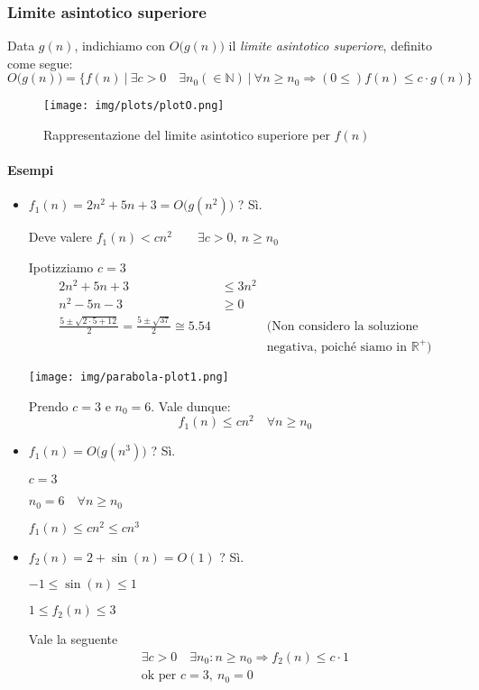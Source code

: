 \subsubsection{Limite asintotico superiore}
Data $g(n)$, indichiamo con $O \big(g(n) \big)$ il \emph{limite asintotico superiore}, definito come segue:
\begin{displaymath}
	O \big(g(n) \big) = \{ f(n) \ \vert \ \exists c > 0 \quad \exists n_0 (\in \mathbb{N}) \ \vert \ \forall n \geq n_0 \Rightarrow (0 \leq) f(n) \leq c \cdot g(n) \}
\end{displaymath}

\begin{figure}[!htb]
	\centering
	\texttt{[image: img/plots/plotO.png]}
	\caption{Rappresentazione del limite asintotico superiore per $f(n)$}
\end{figure}

\paragraph{Esempi}
\begin{itemize}
	\item $f_1(n) = 2n^2 + 5n + 3 = O \big(g(n^2) \big)$ ? Sì. \par
	Deve valere $f_1(n) < cn^2 \qquad \exists c > 0, \ n \geq n_0$ \par
	Ipotizziamo $c = 3$
	\begin{align*}
		2n^2 + 5n + 3 & \leq 3n^2 \\
		n^2 - 5n - 3 & \geq 0 \\
		\frac{5 \pm \sqrt{2 \cdot 5 + 12}}{2} = \frac{5 \pm \sqrt{37}}{2} \cong 5.54 && \text{(Non considero la soluzione} \\ && \text{negativa, poiché siamo in } \mathbb{R}^+ \text{)}
	\end{align*}
	\begin{center}
		\texttt{[image: img/parabola-plot1.png]}
	\end{center}
	
	Prendo $c = 3$ e $n_0 = 6$. Vale dunque:
	\begin{displaymath}
		f_1(n) \leq cn^2 \quad \forall n \geq n_0
	\end{displaymath}

	\item $f_1(n) = O \big(g(n^3) \big)$ ? Sì. \par
	$c = 3 $\par
	$n_0 = 6 \quad \forall n \geq n_0$ \par
	$f_1(n) \leq cn^2 \leq cn^3$
	
	\item $f_2(n) = 2 + \sin (n) = O(1)$ ? Sì. \par
	$-1 \leq \sin (n) \leq 1$ \par
	$1 \leq f_2(n) \leq 3$ \par
	Vale la seguente
	\begin{gather*}
		\exists c > 0 \quad \exists n_0 : n \geq n_0 \Rightarrow f_2(n) \leq c \cdot 1 \\
		\text{ok per } c = 3, \ n_0 = 0
	\end{gather*}
\end{itemize}

